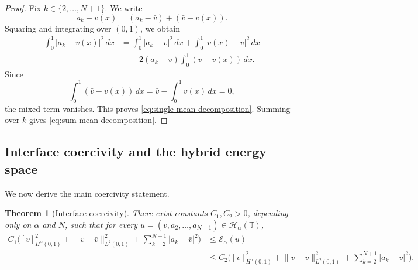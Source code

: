 \documentclass[11pt]{article}
\numberwithin{equation}{section}
\newtheorem{theorem}{Theorem}[section]
\theoremstyle{definition}
\newcommand{\T}{\mathbb{T}}
\newcommand{\EE}{\mathcal{E}}
\newcommand{\HH}{\mathcal{H}}
\newcommand{\abs}[1]{\lvert#1\rvert}
\newcommand{\norm}[1]{\lVert#1\rVert}
\begin{document}
\begin{proof}
Fix $k\in\{2,\dots,N+1\}$. We write
\[
a_k-v(x)=(a_k-\bar v)+(\bar v-v(x)).
\]
Squaring and integrating over $(0,1)$, we obtain
\begin{align*}
\int_0^1\abs{a_k-v(x)}^2\,dx
&=\int_0^1 \abs{a_k-\bar v}^2\,dx
+\int_0^1\abs{v(x)-\bar v}^2\,dx \\
&\quad +2(a_k-\bar v)\int_0^1(\bar v-v(x))\,dx.
\end{align*}
Since
\[
\int_0^1(\bar v-v(x))\,dx=\bar v-\int_0^1v(x)\,dx=0,
\]
the mixed term vanishes. This proves \eqref{eq:single-mean-decomposition}. Summing over $k$ gives \eqref{eq:sum-mean-decomposition}.
\end{proof}

\subsection{Interface coercivity and the hybrid energy space}

We now derive the main coercivity statement.

\begin{theorem}[Interface coercivity]\label{thm:interface-coercivity}
There exist constants $C_1,C_2>0$, depending only on $\alpha$ and $N$, such that for every $u=(v,a_2,\dots,a_{N+1})\in\HH_\alpha(\T)$,
\begin{align}
C_1\Big(
[v]_{H^\alpha(0,1)}^2
+\norm{v-\bar v}_{L^2(0,1)}^2
+\sum_{k=2}^{N+1}\abs{a_k-\bar v}^2
\Big)
&\le \EE_\alpha(u)
\label{eq:coercivity-lower}\\
&\le
C_2\Big(
[v]_{H^\alpha(0,1)}^2
+\norm{v-\bar v}_{L^2(0,1)}^2
+\sum_{k=2}^{N+1}\abs{a_k-\bar v}^2
\Big).
\label{eq:coercivity-upper}
\end{align}
\end{theorem}
\end{document}
